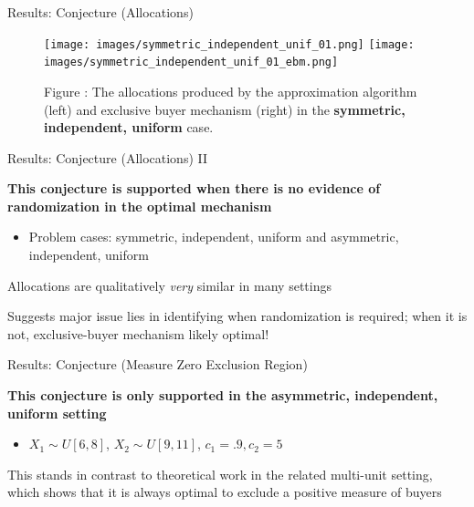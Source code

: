 \documentclass[aspectratio=169,xcolor=dvipsnames]{beamer}
\newcounter{fig}
\begin{document}

\begin{frame}{Results: Conjecture (Allocations)}

\begin{figure}[H]
    \begin{center}
    \texttt{[image: images/symmetric\_independent\_unif\_01.png]}
    \texttt{[image: images/symmetric\_independent\_unif\_01\_ebm.png]}
    \end{center}
    
    \vspace{1mm}
    \raggedright{\small {\sc Figure \thefig\label{fig:pavlov_n2_alloc}:} The allocations produced by the approximation algorithm (left) and exclusive buyer mechanism (right) in the \textbf{symmetric, independent, uniform} case.} 
\end{figure}

\end{frame}


\begin{frame}{Results: Conjecture (Allocations) II}

\textbf{This conjecture is supported when there is no evidence of randomization in the optimal mechanism}
\begin{itemize}
    \item Problem cases: symmetric, independent, uniform \autocite{pavlov2011optimal} and asymmetric, independent, uniform \autocite{belloni2010multidimensional}
\end{itemize}

\vspace{5mm}
Allocations are qualitatively \textit{very} similar in many settings

\vspace{5mm}
{\color{red}Suggests major issue lies in identifying when randomization is required; when it is not, exclusive-buyer mechanism likely optimal!}



\end{frame}



\begin{frame}{Results: Conjecture (Measure Zero Exclusion Region)}

\textbf{This conjecture is only supported in the asymmetric, independent, uniform setting}
\begin{itemize}
    \item $X_1 \sim U[6,8]$, $X_2 \sim U[9,11]$, $c_1 = .9, c_2 = 5$ \autocite{belloni2010multidimensional}
\end{itemize}

\vspace{5mm}
This stands in contrast to theoretical work in the related multi-unit setting, which shows that it is always optimal to exclude a positive measure of buyers \autocite{armstrong1996multiproduct,rochet1998ironing}


\end{frame}
\end{document}
